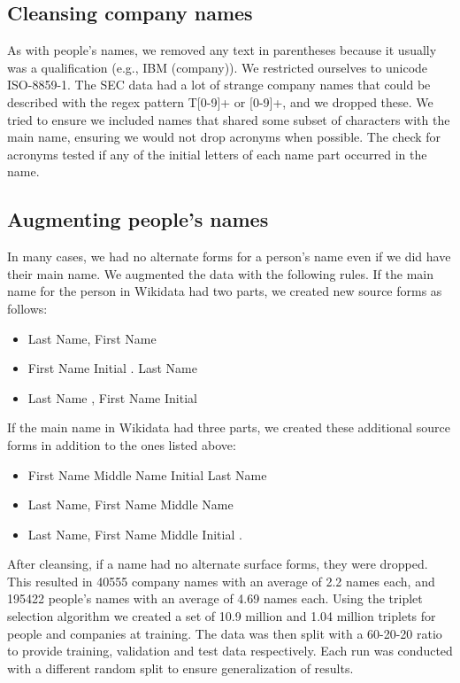 \subsection{Cleansing company names}
As with people's names, we removed any text in parentheses because it usually was a qualification (e.g., IBM (company)).  We restricted ourselves to unicode ISO-8859-1.  The SEC data had a lot of strange company names that could be described with the regex pattern T[0-9]+ or [0-9]+, and we dropped these.  We tried to ensure we included names that shared some subset of characters with the main name, ensuring we would not drop acronyms when possible.  The check for acronyms tested if any of the initial letters of each name part occurred in the name.

\subsection{Augmenting people's names}
In many cases, we had no alternate forms for a person's name even if we did have their main name.  We augmented the data with the following rules.  If the main name for the person in Wikidata had two parts, we created new source forms as follows: 
\begin{itemize}
\item Last Name, First Name
\item First Name Initial . Last Name
\item Last Name , First Name Initial
\end{itemize}
If the main name in Wikidata had three parts, we created these additional source forms in addition to the ones listed above:
\begin{itemize}
\item First Name Middle Name Initial Last Name
\item Last Name, First Name Middle Name
\item Last Name, First Name Middle Initial .
\end{itemize}

After cleansing, if a name had no alternate surface forms, they were dropped.  This resulted in 40555 company names with an average of 2.2 names each, and 195422 people's names with an average of 4.69 names each.  Using the triplet selection algorithm we created a set of 10.9 million and 1.04 million triplets for people and companies at training.  The data was then split with a 60-20-20 ratio to provide training, validation and test data respectively.  Each run was conducted with a different random split to ensure generalization of results.

